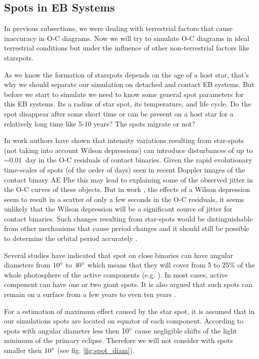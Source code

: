 \subsection{Spots in EB Systems}
In previous subsections, we were dealing with terrestrial factors that cause inaccuracy in O-C diagrams. 
Now we will try to simulate O-C diagrams in ideal terrestrial conditions but under the influence of other non-terrestrial factors like starspots.

As we know the formation of starspots depends on the age of a host star, that's why we should separate our simulation on detached and contact EB systems. 
But before we start to simulate we need to know some general spot parameters for this EB systems. Its a radius of star spot, its temperature, and life cycle. Do the spot disappear after some short time or can be present on a host star for a relatively long time like 5-10 years? The spots migrate or not?  

In work \cite{Kalimeris2002} authors have
shown that intensity variations resulting from star-spots (not taking into account Wilson depressions) can introduce disturbances of
up to $\sim 0.01$~day in the O-C residuals of contact binaries. Given the
rapid evolutionary time-scales of spots (of the order of days) seen in
recent Doppler images of the contact binary AE Phe \citep{Barnes2004} 
this may lead to explaining some of the observed jitter in the
O-C curves of these objects. But in work \cite{Watson2004}, the effects of a
Wilson depression seem to result in a scatter of only a few seconds
in the O-C residuals, it seems unlikely that the Wilson depression
will be a significant source of jitter for contact binaries.
Such changes resulting from star-spots
would be distinguishable from other mechanisms that cause period
changes and it should still be possible to determine the orbital period accurately  \citep{Watson2004}.

Several studies have indicated that spot on close binaries can have angular diameters from $10\degree$ to $40\degree$ which means that they
will cover from 5 to 25\% of the whole photosphere of the active components (e.g. \cite{Hall1990, Guinan1993}).
In most cases, active component can have one or two giant spots. It is also argued that such spots can remain on a surface from a few years to even ten years \citep{Kalimeris2002}. 

For a estimation of maximum effect caused by the star spot, it is assumed that in our simulations spots are located on equator of each component.
According to \cite{Kalimeris2002} spots with angular diameter less then $10\degree$ cause negligible shifts of the light minimum of the primary eclipse. Therefore we will not consider with spots smaller then $10\degree$ (see fig. \ref{fig:spot_diam}).

